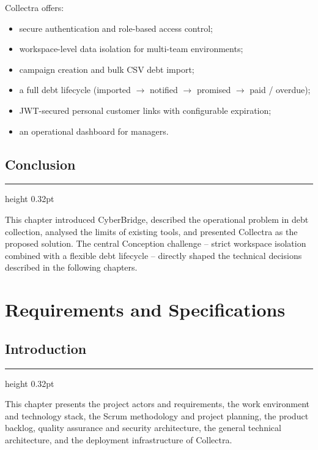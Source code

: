 \documentclass[12pt,a4paper]{report}
\newcommand{\sectionrule}{%
  \vspace{-1pt}%
  {\color{accentblue!22}\hrule height 0.32pt}%
  \vspace{5pt}%
}
\begin{document}
\medskip
Collectra offers:
\begin{itemize}
  \item secure authentication and role-based access control;
  \item workspace-level data isolation for multi-team environments;
  \item campaign creation and bulk CSV debt import;
  \item a full debt lifecycle (imported $\to$ notified $\to$ promised $\to$ paid / overdue);
  \item JWT-secured personal customer links with configurable expiration;
  \item an operational dashboard for managers.
\end{itemize}

\section*{Conclusion}
{}
\sectionrule

This chapter introduced CyberBridge, described the operational problem in debt
collection, analysed the limits of existing tools, and presented Collectra as the
proposed solution.
The central Conception challenge -- strict workspace isolation combined with a flexible
debt lifecycle -- directly shaped the technical decisions described in the following
chapters.

\clearpage

\chapter{Requirements and Specifications}

\section*{Introduction}
{}
\sectionrule

This chapter presents the project actors and requirements, the work environment and
technology stack, the Scrum methodology and project planning, the product backlog,
quality assurance and security architecture, the general technical architecture,
and the deployment infrastructure of Collectra.
\end{document}
